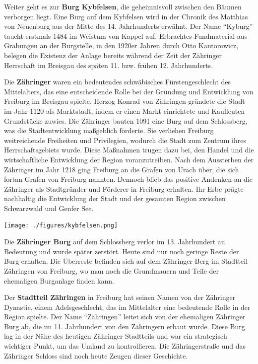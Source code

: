 \documentclass[landscape, a4paper]{article}
\newcommand\alert[1]{\textcolor{PrimaryColor}{\textbf{#1}}}
\begin{document}
\begin{minipage}[t]{0.33\textwidth}
	\setlength{\parskip}{0.25cm}
	\vspace{0cm}

	Weiter geht es zur \alert{Burg Kybfelsen}, die geheimnisvoll zwischen den Bäumen verborgen liegt. Eine Burg auf dem Kybfelsen wird in der Chronik des Matthias von Neuenburg aus der Mitte des 14. Jahrhunderts erwähnt. Der Name \enquote{Kyburg} taucht erstmals 1484 im Weistum von Kappel auf. Erbrachtes Fundmaterial aus Grabungen an der Burgstelle, in den 1920er Jahren durch Otto Kantorowicz, belegen die Existenz der Anlage bereits während der Zeit der Zähringer Herrschaft im Breisgau des späten 11. bzw. frühen 12. Jahrhunderts. %

	Die \alert{Zähringer} waren ein bedeutendes schwäbisches Fürstengeschlecht des Mittelalters, das eine entscheidende Rolle bei der Gründung und Entwicklung von Freiburg im Breisgau spielte. Herzog Konrad von Zähringen gründete die Stadt im Jahr 1120 als Marktstadt, indem er einen Markt einrichtete und Kaufleuten Grundstücke zuwies. Die Zähringer bauten 1091 eine Burg auf dem Schlossberg, was die Stadtentwicklung maßgeblich förderte. Sie verliehen Freiburg weitreichende Freiheiten und Privilegien, wodurch die Stadt zum Zentrum ihres Herrschaftsgebiets wurde. Diese Maßnahmen trugen dazu bei, den Handel und die wirtschaftliche Entwicklung der Region voranzutreiben. Nach dem Aussterben der Zähringer im Jahr 1218 ging Freiburg an die Grafen von Urach über, die sich fortan Grafen von Freiburg nannten. Dennoch blieb das positive Andenken an die Zähringer als Stadtgründer und Förderer in Freiburg erhalten. Ihr Erbe prägte nachhaltig die Entwicklung der Stadt und der gesamten Region zwischen Schwarzwald und Genfer See.

	\texttt{[image: ./figures/kybfelsen.png]}
	\setlength{\parskip}{0.25cm}
	\vspace{0.15cm}

  Die \alert{Zähringer Burg} auf dem Schlossberg verlor im 13. Jahrhundert an Bedeutung und wurde später zerstört. Heute sind nur noch geringe Reste der Burg erhalten. Die Überreste befinden sich auf dem Zähringer Berg im Stadtteil Zähringen von Freiburg, wo man noch die Grundmauern und Teile der ehemaligen Burganlage finden kann.


  Der \alert{Stadtteil Zähringen} in Freiburg hat seinen Namen von der Zähringer Dynastie, einem Adelsgeschlecht, das im Mittelalter eine bedeutende Rolle in der Region spielte. Der Name \enquote{Zähringen} leitet sich von der ehemaligen Zähringer Burg ab, die im 11. Jahrhundert von den Zähringern erbaut wurde. Diese Burg lag in der Nähe des heutigen Zähringer Stadtteils und war ein strategisch wichtiger Punkt, um das Umland zu kontrollieren. Die Zähringerstraße und das Zähringer Schloss sind noch heute Zeugen dieser Geschichte.


\end{minipage}
\end{document}
